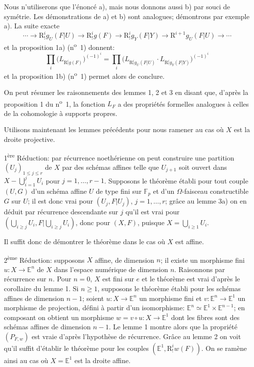 Nous n'utiliserons que l'énoncé a), mais nous donnons aussi b) par souci de symétrie. Les démonstrations de a) et b) sont analogues; démontrons par exemple a). La suite exacte
\[
\cdots\longrightarrow \mathrm{R}^i_!g_U(F|U)\longrightarrow \mathrm{R}^i_!g(F)
\longrightarrow \mathrm{R}^i_!g_Y(F|Y)\longrightarrow \mathrm{R}^{i+1}g_U(F|U)\longrightarrow\cdots
\]
et la proposition 1a) (n\textsuperscript{o}~1) donnent:
\[
\prod_i\bigl(L_{\mathrm{R}^i_!g(F)}\bigr)^{(-1)^i}
=\prod_i\bigl(L_{\mathrm{R}^i_!g_U(F|U)}\cdot L_{\mathrm{R}^i_!g_Y(F|Y)}\bigr)^{(-1)^i}
\]
et la proposition 1b) (n\textsuperscript{o}~1) permet alors de conclure.

On peut résumer les raisonnements des lemmes 1, 2 et 3 en disant que, d'après la proposition 1 du n\textsuperscript{o}~1, la fonction $L_F$ a des propriétés formelles analogues à celles de la cohomologie à supports 
propres.

Utilisons maintenant les lemmes précédents pour nous ramener au cas où $X$ est la droite projective.

1\textsuperscript{ère} Réduction: par récurrence noethérienne on peut construire une partition $(U_j)_{1\le j\le r}$ de $X$ par des schémas affines telle que $U_{j+1}$ soit ouvert dans $X-\bigcup_{i=1}^jU_i$ pour $j=1,\ldots,r-1$. Supposons le théorème établi pour tout couple $(U,G)$ d'un schéma affine $U$ de type fini sur $\mathbb{F}_p$ et d'un $\Omega$-faisceau constructible $G$ sur $U$; il est donc vrai pour $(U_j,F|U_j)$, $j=1,\ldots,r$; grâce au lemme 3a) on en déduit par récurrence descendante sur $j$ qu'il est vrai pour $(\bigcup_{i\ge j}U_i,F|\bigcup_{i\ge j}U_i)$, donc pour $(X,F)$, puisque $X=\bigcup_{i\ge1}U_i$.

Il suffit donc de démontrer le théorème dans le cas où $X$ est affine.

2\textsuperscript{ème} Réduction: supposons $X$ affine, de dimension $n$; il existe un morphisme fini $u:X\to\mathbb{E}^n$ de $X$ dans l'espace numérique de dimension $n$. Raisonnons par récurrence sur $n$. Pour $n=0$, $X$ est fini sur $e$ et le théorème est vrai d'après le corollaire du lemme 1. Si $n\ge1$, supposons le théorème établi pour les schémas affines de dimension $n-1$; soient $u:X\to\mathbb{E}^n$ un morphisme fini et $v:\mathbb{E}^n\to\mathbb{E}^1$ un morphisme de projection, défini à partir d'un isomorphisme: $\mathbb{E}^n\simeq\mathbb{E}^1\times\mathbb{E}^{n-1}$; en composant on obtient un morphisme $w=v\circ u:X\to\mathbb{E}^1$ dont les fibres sont des schémas affines de dimension $n-1$. Le lemme 1 montre alors que la propriété $(P_{F,w})$ est vraie d'après l'hypothèse de récurrence. Grâce au lemme 2 on voit qu'il suffit d'établir le théorème pour les couples 
$(\mathbb{E}^1,\mathrm{R}^i_!w(F))$. On se ramène
ainsi au cas où $X=\mathbb{E}^1$ est la droite affine.

